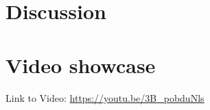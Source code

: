 \section{Discussion}


\nocite{*}
\printbibliography
\clearpage
\onecolumn  
\appendices
\section{Video showcase}
\label{showcase}
Link to Video: \href{https://youtu.be/3B_pobduNls}{https://youtu.be/3B_pobduNls} 

